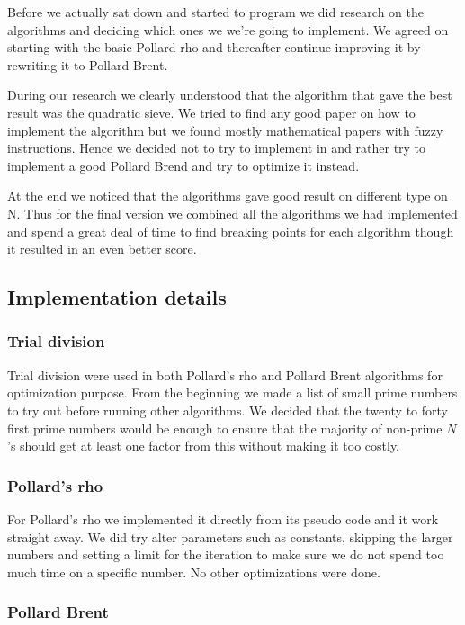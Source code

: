 Before we actually sat down and started to program we did research on the algorithms and deciding which ones we we’re going to implement. We agreed on starting with the basic Pollard rho and thereafter continue improving it by rewriting it to Pollard Brent.

During our research we clearly understood that the algorithm that gave the best result was the quadratic sieve. We tried to find any good paper on how to implement the algorithm but we found mostly mathematical papers with fuzzy instructions. Hence we decided not to try to implement in and rather try to implement a good Pollard Brend and try to optimize it instead.

At the end we noticed that the algorithms gave good result on different type on N. Thus for the final version we combined all the algorithms we had implemented and spend a great deal of time to find breaking points for each algorithm though it resulted in an even better score.

\subsection{Implementation details}

\subsubsection{Trial division}

Trial division were used in both Pollard’s rho and Pollard Brent algorithms for optimization purpose. From the beginning we made a list of small prime numbers to try out before running other algorithms. We decided that the twenty to forty first prime numbers would be enough to ensure that the majority of non-prime $N$’s should get at least one factor from this without making it too costly.

\subsubsection{Pollard’s rho}

For Pollard’s rho we implemented it directly from its pseudo code and it work straight away. We did try alter parameters such as constants, skipping the larger numbers and setting a limit for the iteration to make sure we do not spend too much time on a specific number. No other optimizations were done. 

\subsubsection{Pollard Brent}

